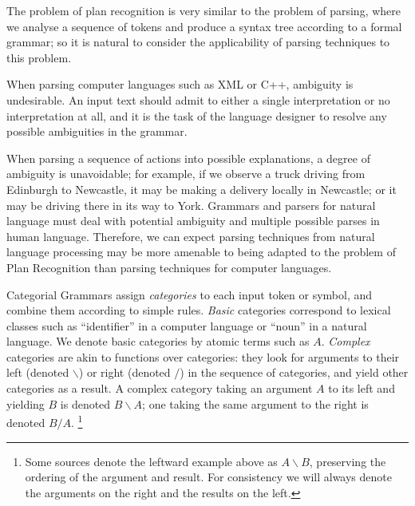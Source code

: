 The problem of plan recognition is very similar to the problem of parsing, where we analyse a sequence of tokens and produce a syntax tree according to a formal grammar; so it is natural to consider the applicability of parsing techniques to this problem.

When parsing computer languages such as XML or C++, ambiguity is undesirable. An input text should admit to either a single interpretation or no interpretation at all, and it is the task of the language designer to resolve any possible ambiguities in the grammar.

When parsing a sequence of actions into possible explanations, a degree of ambiguity is unavoidable; for example, if we observe a truck driving from Edinburgh to Newcastle, it may be making a delivery locally in Newcastle; or it may be driving there in its way to York. Grammars and parsers for natural language must deal with potential ambiguity and multiple possible parses in human language. Therefore, we can expect parsing techniques from natural language processing may be more amenable to being adapted to the problem of Plan Recognition than parsing techniques for computer languages.


Categorial Grammars assign \emph{categories} to each input token or symbol, and combine them according to simple rules. \emph{Basic} categories correspond to lexical classes such as ``identifier'' in a computer language or ``noun'' in a natural language. We denote basic categories by atomic terms such as $A$. \emph{Complex} categories are akin to functions over categories: they look for arguments to their left (denoted $\backslash$) or right (denoted $/$) in the sequence of categories, and yield other categories as a result. A complex category taking an argument $A$ to its left and yielding $B$ is denoted $B\backslash A$; one taking the same argument to the right is denoted $B/A$. \footnote{Some sources denote the leftward example above as $A\backslash B$, preserving the ordering of the argument and result. For consistency we will always denote the arguments on the right and the results on the left.}

